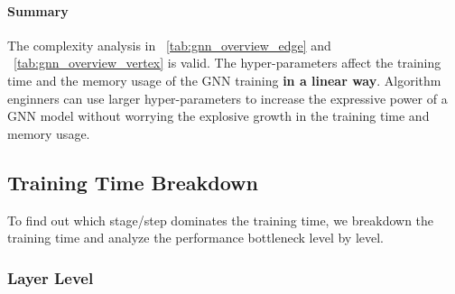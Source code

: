 \paragraph{Summary}

The complexity analysis in \tablename~\ref{tab:gnn_overview_edge} and \tablename~\ref{tab:gnn_overview_vertex} is valid.
The hyper-parameters affect the training time and the memory usage of the GNN training \textbf{in a linear way}.
Algorithm enginners can use larger hyper-parameters to increase the expressive power of a GNN model without worrying the explosive growth in the training time and memory usage.

\subsection{Training Time Breakdown}
\label{sec:training_time_breakdown}

To find out which stage/step dominates the training time, we breakdown the training time and analyze the performance bottleneck level by level.

\subsubsection{Layer Level}

